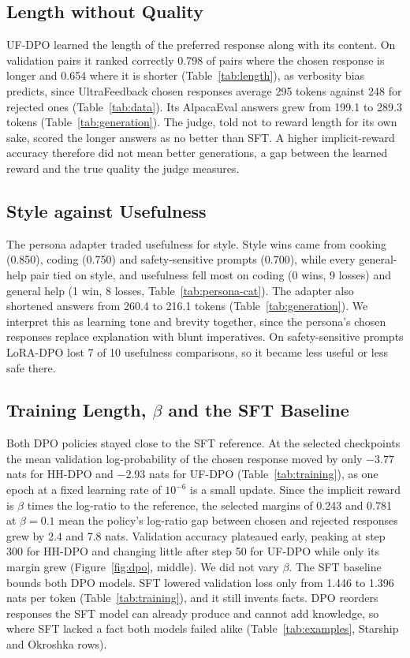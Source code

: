 \documentclass{article}
\begin{document}
\subsection{Length without Quality}
\label{subsec:length}

UF-DPO learned the length of the preferred response along with its content. On validation pairs it ranked correctly 0.798 of pairs where the chosen response is longer and 0.654 where it is shorter (Table~\ref{tab:length}), as verbosity bias predicts, since UltraFeedback chosen responses average 295 tokens against 248 for rejected ones (Table~\ref{tab:data}). Its AlpacaEval answers grew from 199.1 to 289.3 tokens (Table~\ref{tab:generation}). The judge, told not to reward length for its own sake, scored the longer answers as no better than SFT. A higher implicit-reward accuracy therefore did not mean better generations, a gap between the learned reward and the true quality the judge measures.

\subsection{Style against Usefulness}

The persona adapter traded usefulness for style. Style wins came from cooking (0.850), coding (0.750) and safety-sensitive prompts (0.700), while every general-help pair tied on style, and usefulness fell most on coding (0 wins, 9 losses) and general help (1 win, 8 losses, Table~\ref{tab:persona-cat}). The adapter also shortened answers from 260.4 to 216.1 tokens (Table~\ref{tab:generation}). We interpret this as learning tone and brevity together, since the persona's chosen responses replace explanation with blunt imperatives. On safety-sensitive prompts LoRA-DPO lost 7 of 10 usefulness comparisons, so it became less useful or less safe there.

\subsection{\texorpdfstring{Training Length, $\beta$ and the SFT Baseline}{Training Length, beta and the SFT Baseline}}

Both DPO policies stayed close to the SFT reference. At the selected checkpoints the mean validation log-probability of the chosen response moved by only $-3.77$ nats for HH-DPO and $-2.93$ nats for UF-DPO (Table~\ref{tab:training}), as one epoch at a fixed learning rate of $10^{-6}$ is a small update. Since the implicit reward is $\beta$ times the log-ratio to the reference, the selected margins of 0.243 and 0.781 at $\beta=0.1$ mean the policy's log-ratio gap between chosen and rejected responses grew by 2.4 and 7.8 nats. Validation accuracy plateaued early, peaking at step 300 for HH-DPO and changing little after step 50 for UF-DPO while only its margin grew (Figure~\ref{fig:dpo}, middle). We did not vary $\beta$. The SFT baseline bounds both DPO models. SFT lowered validation loss only from 1.446 to 1.396 nats per token (Table~\ref{tab:training}), and it still invents facts. DPO reorders responses the SFT model can already produce and cannot add knowledge, so where SFT lacked a fact both models failed alike (Table~\ref{tab:examples}, Starship and Okroshka rows).
\end{document}
